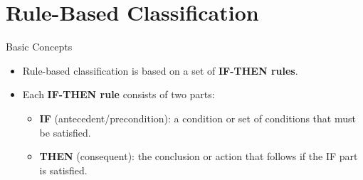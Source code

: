 \section{Rule-Based Classification}

\begin{frame}{Basic Concepts}
	\begin{itemize}
		\item Rule-based classification is based on a set of \textbf{IF-THEN rules}.
		\item Each \textbf{IF-THEN rule} consists of two parts:
		      \begin{itemize}
			      \item \textbf{\color{airforceblue}IF} (antecedent/precondition): a condition or set of conditions that must be satisfied.
			      \item \textbf{\color{airforceblue}THEN} (consequent): the conclusion or action that follows if the IF part is satisfied.
		      \end{itemize}
	\end{itemize}
\end{frame}

